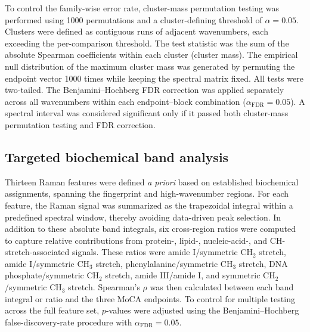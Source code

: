 \documentclass[preprint,12pt]{elsarticle}
\begin{document}
To control the family-wise error rate, cluster-mass permutation testing was performed using 1000 permutations and a cluster-defining threshold of $\alpha = 0.05$. Clusters were defined as contiguous runs of adjacent wavenumbers, each exceeding the per-comparison threshold. The test statistic was the sum of the absolute Spearman coefficients within each cluster (cluster mass). The empirical null distribution of the maximum cluster mass was generated by permuting the endpoint vector 1000 times while keeping the spectral matrix fixed. All tests were two-tailed. The Benjamini--Hochberg FDR correction was applied separately across all wavenumbers within each endpoint--block combination ($\alpha_{\text{FDR}} = 0.05$). A spectral interval was considered significant only if it passed both cluster-mass permutation testing and FDR correction.

\subsection{Targeted biochemical band analysis}
\label{subsec:band_analysis}

Thirteen Raman features were defined \textit{a priori} based on established biochemical assignments, spanning the fingerprint and high-wavenumber regions. For each feature, the Raman signal was summarized as the trapezoidal integral within a predefined spectral window, thereby avoiding data-driven peak selection. In addition to these absolute band integrals, six cross-region ratios were computed to capture relative contributions from protein-, lipid-, nucleic-acid-, and CH-stretch-associated signals. These ratios were amide I/symmetric CH$_2$ stretch, amide I/symmetric CH$_3$ stretch, phenylalanine/symmetric CH$_3$ stretch, DNA phosphate/symmetric CH$_2$ stretch, amide III/amide I, and symmetric CH$_2$/symmetric CH$_3$ stretch. Spearman's $\rho$ was then calculated between each band integral or ratio and the three MoCA endpoints. To control for multiple testing across the full feature set, $p$-values were adjusted using the Benjamini--Hochberg false-discovery-rate procedure with $\alpha_{\mathrm{FDR}} = 0.05$.
\end{document}
